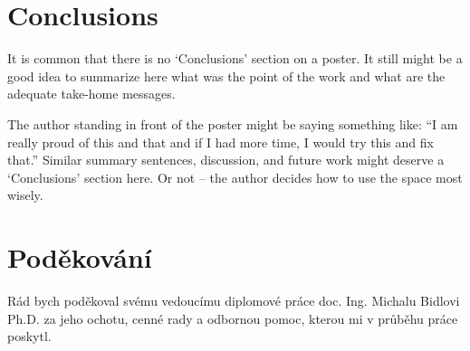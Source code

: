 \documentclass[czech]{ExcelAtFIT} %
\begin{document}
\section{Conclusions}
\label{sec:Conclusions}

It is common that there is no `Conclusions' section on a poster.  It still might be a good idea to summarize here what was the point of the work and what are the adequate take-home messages.  

The author standing in front of the poster might be saying something like: ``I am really proud of this and that and if I had more time, I would try this and fix that.''  Similar summary sentences, discussion, and future work might deserve a `Conclusions' section here. Or not -- the author decides how to use the space most wisely.


\section*{Poděkování}
Rád bych poděkoval svému vedoucímu diplomové práce doc. Ing. Michalu Bidlovi Ph.D. za jeho ochotu, cenné rady a odbornou pomoc, kterou mi v průběhu práce poskytl.




\end{document}
